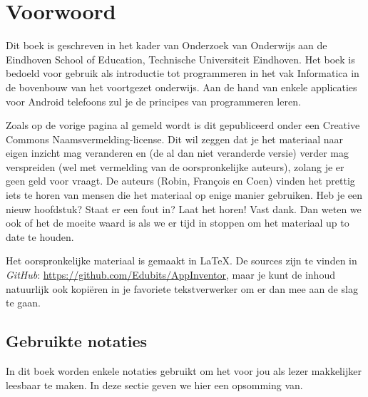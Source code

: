 \chapter*{Voorwoord}

Dit boek is geschreven in het kader van Onderzoek van Onderwijs aan de Eindhoven School of Education, Technische Universiteit Eindhoven. Het boek is bedoeld voor gebruik als introductie tot programmeren in het vak Informatica in de bovenbouw van het voortgezet onderwijs. Aan de hand van enkele applicaties voor Android telefoons zul je de principes van programmeren leren.

Zoals op de vorige pagina al gemeld wordt is dit gepubliceerd onder een Creative Commons Naamsvermelding-license. Dit wil zeggen dat je het materiaal naar eigen inzicht mag veranderen en (de al dan niet veranderde versie) verder mag verspreiden (wel met vermelding van de oorspronkelijke auteurs), zolang je er geen geld voor vraagt. De auteurs (Robin, Fran\c{c}ois en Coen) vinden het prettig iets te horen van mensen die het materiaal op enige manier gebruiken. Heb je een nieuw hoofdstuk? Staat er een fout in? Laat het horen! Vast dank. Dan weten we ook of het de moeite waard is als we er tijd in stoppen om het materiaal up to date te houden. 

Het oorspronkelijke materiaal is gemaakt in \LaTeX. De sources zijn te vinden in 
\emph{GitHub}: \url{https://github.com/Edubits/AppInventor}, maar je kunt de inhoud natuurlijk ook kopi\"eren in je favoriete tekstverwerker om er dan mee aan de slag te gaan. 



\section*{Gebruikte notaties}
In dit boek worden enkele notaties gebruikt om het voor jou als lezer makkelijker leesbaar te maken. In deze sectie geven we hier een opsomming van.

